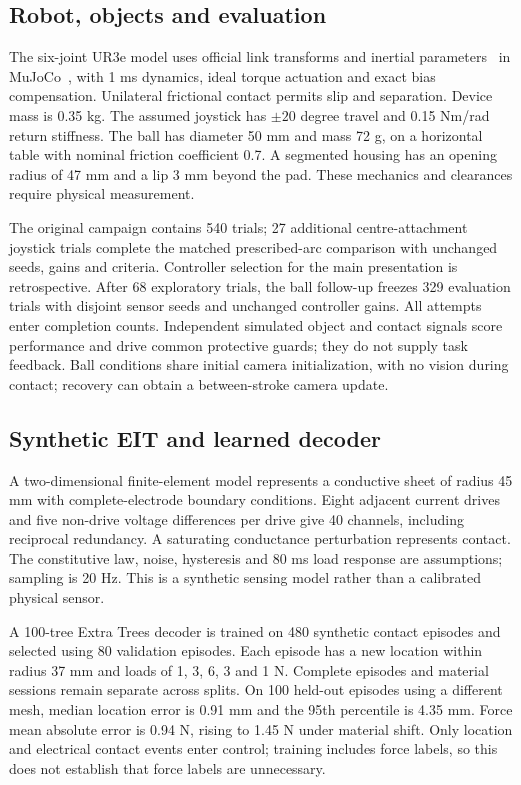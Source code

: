 \documentclass[letterpaper,10pt,conference]{IEEEtran}
\begin{document}
\subsection{Robot, objects and evaluation}
The six-joint UR3e model uses official link transforms and inertial parameters~\cite{ur} in MuJoCo~\cite{mujoco}, with 1 ms dynamics, ideal torque actuation and exact bias compensation. Unilateral frictional contact permits slip and separation. Device mass is 0.35 kg. The assumed joystick has $\pm20$ degree travel and 0.15 Nm/rad return stiffness. The ball has diameter 50 mm and mass 72 g, on a horizontal table with nominal friction coefficient 0.7. A segmented housing has an opening radius of 47 mm and a lip 3 mm beyond the pad. These mechanics and clearances require physical measurement.

The original campaign contains 540 trials; 27 additional centre-attachment joystick trials complete the matched prescribed-arc comparison with unchanged seeds, gains and criteria. Controller selection for the main presentation is retrospective. After 68 exploratory trials, the ball follow-up freezes 329 evaluation trials with disjoint sensor seeds and unchanged controller gains. All attempts enter completion counts. Independent simulated object and contact signals score performance and drive common protective guards; they do not supply task feedback. Ball conditions share initial camera initialization, with no vision during contact; recovery can obtain a between-stroke camera update.

\subsection{Synthetic EIT and learned decoder}
A two-dimensional finite-element model represents a conductive sheet of radius 45 mm with complete-electrode boundary conditions. Eight adjacent current drives and five non-drive voltage differences per drive give 40 channels, including reciprocal redundancy. A saturating conductance perturbation represents contact. The constitutive law, noise, hysteresis and 80 ms load response are assumptions; sampling is 20 Hz. This is a synthetic sensing model rather than a calibrated physical sensor.

A 100-tree Extra Trees decoder is trained on 480 synthetic contact episodes and selected using 80 validation episodes. Each episode has a new location within radius 37 mm and loads of 1, 3, 6, 3 and 1 N. Complete episodes and material sessions remain separate across splits. On 100 held-out episodes using a different mesh, median location error is 0.91 mm and the 95th percentile is 4.35 mm. Force mean absolute error is 0.94 N, rising to 1.45 N under material shift. Only location and electrical contact events enter control; training includes force labels, so this does not establish that force labels are unnecessary.
\end{document}
